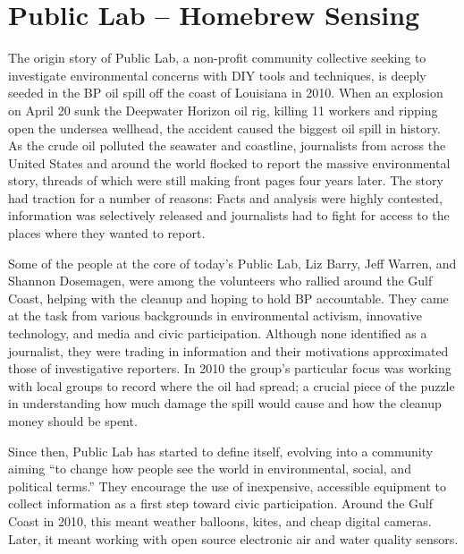 \chapter{Public Lab – Homebrew Sensing}
The origin story of Public Lab, a non-profit community collective seeking
to investigate environmental concerns with DIY tools and techniques, is
deeply seeded in the BP oil spill off the coast of Louisiana in 2010. When an
explosion on April 20 sunk the Deepwater Horizon oil rig, killing 11 workers
and ripping open the undersea wellhead, the accident caused the biggest
oil spill in history. As the crude oil polluted the seawater and coastline, journalists
from across the United States and around the world flocked to report
the massive environmental story, threads of which were still making front
pages four years later. The story had traction for a number of reasons: Facts
and analysis were highly contested, information was selectively released and
journalists had to fight for access to the places where they wanted to report.

Some of the people at the core of today's Public Lab, Liz Barry, Jeff Warren,
and Shannon Dosemagen, were among the volunteers who rallied around
the Gulf Coast, helping with the cleanup and hoping to hold BP accountable.
They came at the task from various backgrounds in environmental activism,
innovative technology, and media and civic participation. Although none
identified as a journalist, they were trading in information and their motivations
approximated those of investigative reporters. In 2010 the group's
particular focus was working with local groups to record where the oil had
spread; a crucial piece of the puzzle in understanding how much damage
the spill would cause and how the cleanup money should be spent.

Since then, Public Lab has started to define itself, evolving into a community
aiming ``to change how people see the world in environmental, social,
and political terms.'' They encourage the use of inexpensive, accessible
equipment to collect information as a first step toward civic participation.
Around the Gulf Coast in 2010, this meant weather balloons, kites, and
cheap digital cameras. Later, it meant working with open source electronic
air and water quality sensors.

